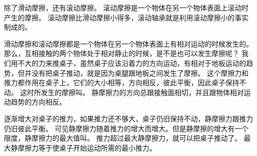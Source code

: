 除了滑动摩擦，还有滚动摩擦。
滚动摩擦是一个物体在另一个物体表面上滚动时产生的摩擦。
滚动摩擦比滑动摩擦小得多，滚动轴承就是利用滚动摩擦小的事实制成的。

滑动摩擦和滚动摩擦都是一个物体在另一个物体表面上有相对运动的时候发生的。
那么，互相接触的两个物体处于相对静止的时候，是不是也可以发生摩擦呢？
我们用不大的力来推桌子，虽然桌子应该沿着力的方向运动，有相对于地板运动的趋势，但并没有把桌子推动，就是因为桌腿跟地板之间发生了摩擦。
这个摩擦力和推力都作用在桌子上，它们的大小相等，方向相反，彼此平衡，因此桌子保持不动。
这时所发生的摩擦叫。
静摩擦力的方向总跟接触面相切，并且跟物体相对运动趋势的方向相反。

逐渐增大对桌子的推力，如果推力还不够大，桌子仍旧保持不动，静摩擦力跟推力仍旧彼此平衡。
可见静摩擦力随着推力的增大而增大。但是静摩擦的增大有一个限度，静摩擦力的最大值叫。
推力超过最大静摩擦力，就可以把桌子推动了。
最大静摩擦力等于使桌子开始运动所需的最小推力。

